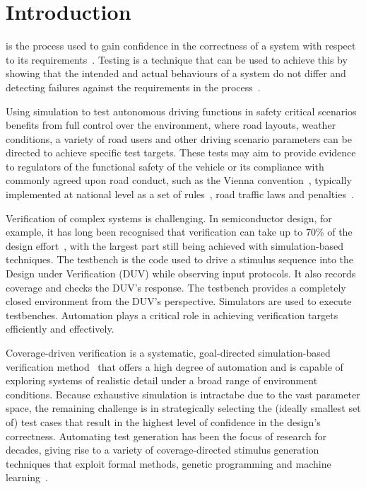 \documentclass[letterpaper, 10 pt, journal, twoside]{IEEEtran}
\begin{document}
\section{Introduction}\label{s:introduction}

 is the process used to gain confidence in the correctness of a system with respect to its requirements~\cite{bergeron2012writing}. Testing is a technique that can be used to achieve this by showing that the intended and actual behaviours of a system do not differ and detecting failures against the requirements in the process~\cite{utting2012taxonomy}.

Using simulation to test autonomous driving functions in safety critical scenarios benefits from full control over the environment, where road layouts, weather conditions, a variety of road users and other driving scenario parameters can be directed to achieve specific test targets. These tests may aim to provide evidence to regulators of the functional safety of the vehicle or its compliance with commonly agreed upon road conduct, such as the Vienna convention~\cite{ViennaConv}, typically implemented at national level as a set of rules~\cite{codes2015highway}, road traffic laws and penalties~\cite{RoadTraffic1988}.

Verification of complex systems is challenging. In semiconductor design, for
example, it has long been recognised that verification can take up to 70\% of
the design effort~\cite{arden2002international}, with the largest part still
being achieved with simulation-based techniques. The testbench is the code used to drive a stimulus sequence into the Design under Verification (DUV) while observing input protocols. It also records coverage and checks the DUV's response. The testbench provides a completely
closed environment from the DUV's perspective. Simulators are used to execute
testbenches. Automation plays a critical role in achieving verification targets
efficiently and effectively.

Coverage-driven verification is a systematic, goal-directed simulation-based
verification method~\cite{HVC2015} that offers a high degree of automation and
is capable of exploring systems of realistic detail under a broad range of
environment conditions. Because exhaustive simulation is intractabe due to the vast parameter space, the remaining challenge is in strategically selecting the (ideally smallest set
of) test cases that result in the highest level of confidence in the design's
correctness. Automating test generation has been the focus of research for decades, giving
rise to a variety of coverage-directed stimulus generation techniques that
exploit formal methods, genetic programming and machine learning~\cite{Ioannides:2012}. 
\end{document}
